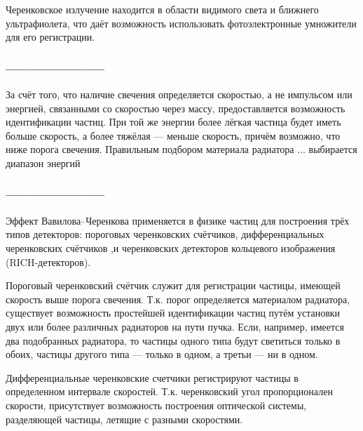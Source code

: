 Черенковское излучение находится в области видимого света и ближнего ультрафиолета, что даёт возможность использовать фотоэлектронные умножители для его регистрации.

\subsubsection{-----------------------}

За счёт того, что наличие свечения определяется скоростью, а не импульсом или энергией, связанными со скоростью через массу, предоставляется возможность идентификации частиц. При той же энергии более лёгкая частица будет иметь больше скорость, а более тяжёлая --- меньше скорость, причём возможно, что ниже порога свечения.
Правильным подбором материала радиатора \todo ... выбирается диапазон энергий

\subsubsection{-----------------------}


Эффект Вавилова--Черенкова применяется в физике частиц для построения трёх типов детекторов: пороговых черенковских счётчиков, дифференциальных черенковских счётчиков \todo,\todo и черенковских детекторов кольцевого изображения (RICH-детекторов). 

Пороговый черенковский счётчик служит для регистрации частицы, имеющей скорость выше порога свечения. Т.к. порог определяется материалом радиатора, существует возможность простейшей идентификации частиц путём установки двух или более различных радиаторов на пути пучка. Если, например, имеется два подобранных радиатора, то частицы одного типа будут светиться только в обоих, частицы другого типа --- только в одном, а третьи --- ни в одном.

Дифференциальные черенковские счетчики регистрируют частицы в определенном интервале скоростей. Т.к. черенковский угол пропорционален скорости, присутствует возможность построения оптической системы, разделяющей частицы, летящие с разными скоростями.

